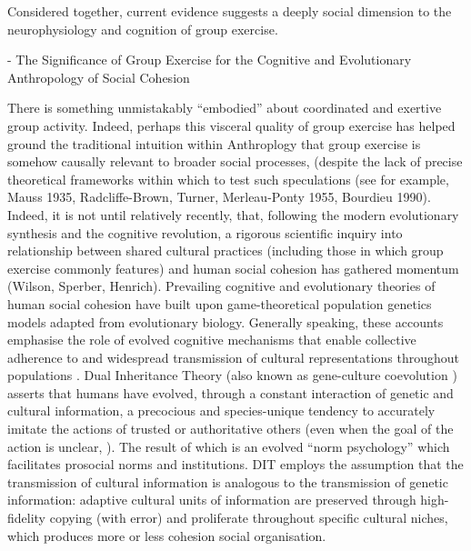 \documentclass[12pt]{report}
\begin{document}
Considered together, current evidence suggests a deeply social dimension to the neurophysiology and cognition of group exercise.






- The Significance of Group Exercise for the Cognitive and Evolutionary Anthropology of Social Cohesion

There is something unmistakably ``embodied'' about coordinated and exertive group activity. Indeed, perhaps this visceral quality of group exercise has helped ground the traditional intuition within Anthroplogy that group exercise is somehow causally relevant to broader social processes, (despite the lack of precise theoretical frameworks within which to test such speculations (see for example, Mauss 1935, Radcliffe-Brown, Turner,  Merleau-Ponty 1955, Bourdieu 1990). Indeed, it is not until relatively recently, that, following the modern evolutionary synthesis and the cognitive revolution, a rigorous scientific inquiry into relationship between shared cultural practices (including those in which group exercise commonly features) and human social cohesion has gathered momentum (Wilson, Sperber, Henrich).  Prevailing cognitive and evolutionary theories of human social cohesion have built upon game-theoretical population genetics models adapted from evolutionary biology.  Generally speaking, these accounts emphasise the role of evolved cognitive mechanisms that enable collective adherence to and widespread transmission of cultural representations throughout populations \citep{Sperber1996,Henrich2007}.  Dual Inheritance Theory (also known as gene-culture coevolution \cite{Richerson2008}) asserts that humans have evolved, through a constant interaction of genetic and cultural information, a precocious and species-unique tendency to accurately imitate the actions of trusted or authoritative others (even when the goal of the action is unclear, \cite{Tomasello2014a}). The result of which is an evolved ``norm psychology'' which facilitates prosocial norms and institutions.  DIT employs the assumption that the transmission of cultural information is analogous to the transmission of genetic information: adaptive cultural units of information are preserved through high-fidelity copying (with error) and proliferate throughout specific cultural niches, which produces more or less cohesion social organisation.
\end{document}
